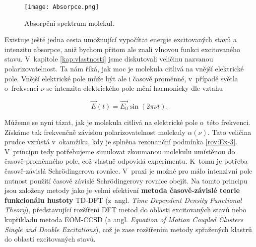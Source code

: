 \begin{figure} [htb]
\centering
\texttt{[image: Absorpce.png]}
\caption{Absorpční spektrum molekul.}
\label{obr:Absorpce}
\end{figure}

Existuje ještě jedna cesta umožnující vypočítat energie excitovaných stavů a intenzitu absorpce, aniž bychom přitom ale znali vlnovou funkci excitovaného stavu. V~kapitole \ref{kap:vlastnosti} jsme diskutovali veličinu nazvanou polarizovatelnost. Ta nám říká, jak moc je molekula citlivá na vnější elektrické pole. Vnější elektrické pole může být ale i časově proměnné, v~případě světla o~frekvenci $\nu$ se intenzita elektrického pole mění harmonicky dle vztahu

\begin{equation}
\vec{E}(t) = \vec{E_0} \sin (2 \pi \nu t).
\label{rov:Ex-6}
\end{equation}

Můžeme se nyní tázat, jak je molekula citlivá na elektrické pole o~této frekvenci. Získáme tak frekvenčně závislou polarizovatelnost molekuly $\alpha(\nu)$. Tato veličina prudce vzrůstá v~okamžiku, kdy je splněna rezonanční podmínka \eqref{rov:Ex-3}. V~principu tedy potřebujeme simulovat zkoumanou molekulu umístěnou do časově-proměnného pole, což vlastně odpovídá experimentu. K~tomu je potřeba časově-závislá Schr\"odingerova rovnice. V~praxi je možné pro málo intenzivní pole nutnost použití časově závislé Schr\"odingerovy rovnice obejít. Na tomto principu jsou založeny metody jako je velmi efektivní \textbf{metoda časově-závislé teorie funkcionálu hustoty} TD-DFT (z~angl. \textit{Time Dependent Density Functional Theory}), představující rozšíření DFT metod do oblasti excitovaných stavů nebo kupříkladu metoda EOM-CCSD (a angl. \textit{Equation of Motion Coupled Clusters Single and Double Excitations}), což je zase rozšířením metody spřažených klastrů do oblasti excitovaných stavů. 
   

